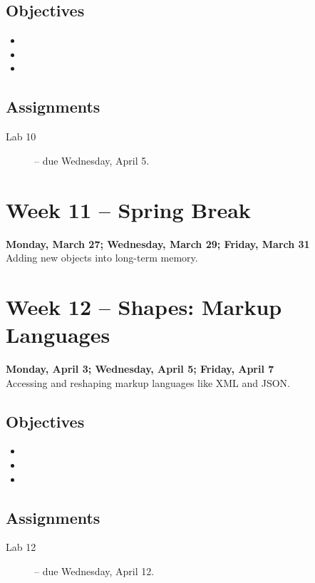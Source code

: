 \documentclass[10pt]{memoir}
\begin{document}
    \subsection{Objectives}
    \begin{itemize}
        \item 
        \item 
        \item 
    \end{itemize}

    \subsection{Assignments}
    \begin{description}%
        \item[Lab 10 ] -- due Wednesday, April 5.
    \end{description}
    
\section{Week 11 -- Spring Break}
\textcolor{CUGold}{\textbf{Monday, March 27; Wednesday, March 29; Friday, March 31}}\\
Adding new objects into long-term memory.

\section{Week 12 -- Shapes: Markup Languages}
\textcolor{CUGold}{\textbf{Monday, April 3; Wednesday, April 5; Friday, April 7}}\\
Accessing and reshaping markup languages like XML and JSON.

    \subsection{Objectives}
    \begin{itemize}
        \item 
        \item 
        \item 
    \end{itemize}

    \subsection{Assignments}
    \begin{description}%
        \item[Lab 12 ] -- due Wednesday, April 12.
    \end{description}
    
\end{document}

